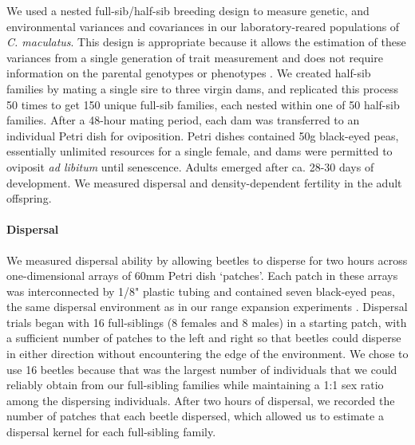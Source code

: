 \documentclass[11pt]{article}
\newcommand{\revise}[1]{{\color{Mahogany}{#1}}}
\begin{document}
We used a nested full-sib/half-sib breeding design to measure genetic, \revise{maternal,} and environmental variances and covariances in our laboratory-reared populations of \textit{C. maculatus}.
This design is appropriate because it allows the estimation of these variances from a single generation of trait measurement and does not require information on the parental genotypes or phenotypes \citep{falconer_introduction_1996,conner_primer_2004,wilson_ecologists_2010}.
We created half-sib families by mating a single sire to three virgin dams, and replicated this process 50 times to get 150 unique full-sib families, each nested within one of 50 half-sib families.
After a 48-hour mating period, each dam was transferred to an individual Petri dish for oviposition.
Petri dishes contained 50g black-eyed peas, essentially unlimited resources for a single female, and dams were permitted to oviposit \textit{ad libitum} until senescence.
Adults emerged after ca. 28-30 days of development.
We measured dispersal and density-dependent fertility in the adult offspring.

\paragraph{Dispersal}
We measured dispersal ability by allowing beetles to disperse for two hours across one-dimensional arrays of 60mm Petri dish `patches'.
Each patch in these arrays was interconnected by 1/8" plastic tubing and contained seven black-eyed peas, the same dispersal environment as in our range expansion experiments \citep{ochocki_rapid_2017}.
Dispersal trials began with 16 full-siblings (8 females and 8 males) in a starting patch, with a sufficient number of patches to the left and right so that beetles could disperse in either direction without encountering the edge of the environment.
We chose to use 16 beetles because that was the largest number of individuals that we could reliably obtain from our full-sibling families while maintaining a 1:1 sex ratio among the dispersing individuals.
After two hours of dispersal, we recorded the number of patches that each beetle dispersed, which allowed us to estimate a dispersal kernel for each full-sibling family.
\end{document}

